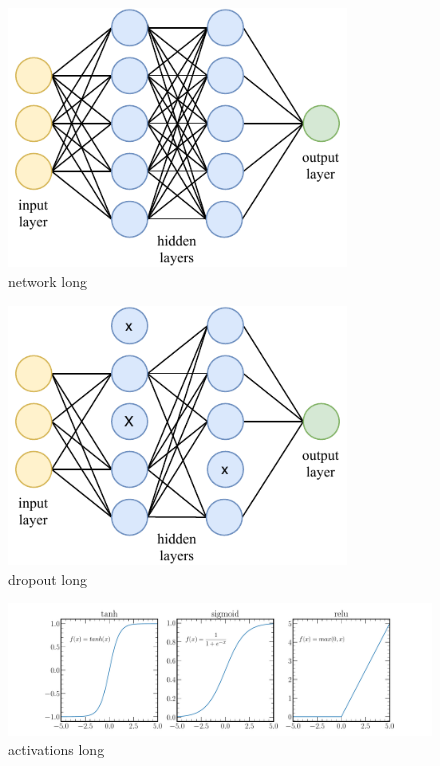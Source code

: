 \begin{figure} %
    \includegraphics[width=0.8\textwidth]{diagrams/6-cvn/network.pdf}
    \caption[network short]
    {network long}
    \label{fig:network}
\end{figure} %

\begin{figure} %
    \includegraphics[width=0.8\textwidth]{diagrams/6-cvn/dropout.pdf}
    \caption[dropout short]
    {dropout long}
    \label{fig:dropout}
\end{figure} %

\begin{figure} %
    \includegraphics[width=\textwidth]{diagrams/6-cvn/activations.pdf}
    \caption[activations short]
    {activations long}
    \label{fig:activations}
\end{figure} %

